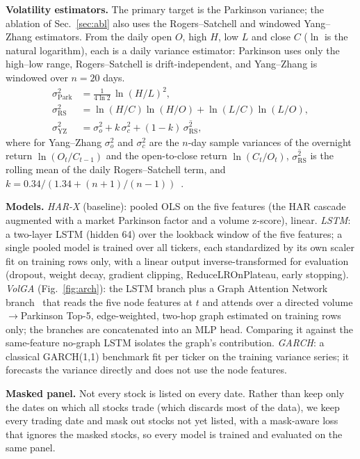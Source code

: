 \documentclass[runningheads]{llncs}
\begin{document}
\textbf{Volatility estimators.} The primary target is the Parkinson variance; the ablation of
Sec.~\ref{sec:abl} also uses the Rogers--Satchell and windowed Yang--Zhang estimators. From the daily open $O$,
high $H$, low $L$ and close $C$ ($\ln$ is the natural logarithm), each is a daily variance estimator: Parkinson
uses only the high--low range, Rogers--Satchell is drift-independent, and Yang--Zhang is windowed over $n{=}20$
days.
\begin{align*}
\sigma^2_{\mathrm{Park}} &= \tfrac{1}{4\ln 2}\,\ln(H/L)^2,\\
\sigma^2_{\mathrm{RS}} &= \ln(H/C)\ln(H/O)+\ln(L/C)\ln(L/O),\\
\sigma^2_{\mathrm{YZ}} &= \sigma^2_{o}+k\,\sigma^2_{c}+(1-k)\,\overline{\sigma^2_{\mathrm{RS}}},
\end{align*}
where for Yang--Zhang $\sigma^2_{o}$ and $\sigma^2_{c}$ are the $n$-day sample variances of the overnight return
$\ln(O_t/C_{t-1})$ and the open-to-close return $\ln(C_t/O_t)$, $\overline{\sigma^2_{\mathrm{RS}}}$ is the
rolling mean of the daily Rogers--Satchell term, and $k=0.34/(1.34+(n{+}1)/(n{-}1))$~\cite{yangzhang2000,rogers1991}.

\textbf{Models.} \emph{HAR-X} (baseline): pooled OLS on the five features (the HAR cascade augmented with a market Parkinson factor and a volume z-score), linear. \emph{LSTM}: a two-layer LSTM
(hidden 64) over the lookback window of the five features; a single pooled model is trained over all tickers,
each standardized by its own scaler fit on training rows only, with a linear output inverse-transformed for
evaluation (dropout, weight decay, gradient clipping, ReduceLROnPlateau, early stopping). \emph{VolGA}
(Fig.~\ref{fig:arch}): the LSTM branch plus a Graph Attention Network branch~\cite{gat2018} that reads the five
node features at $t$ and attends over a directed volume$\to$Parkinson Top-5, edge-weighted, two-hop graph
estimated on training rows only; the branches are concatenated into an MLP head. Comparing it against the same-feature no-graph LSTM isolates the graph's contribution. \emph{GARCH}: a classical GARCH(1,1)
benchmark fit per ticker on the training variance series; it forecasts the variance directly and does not use
the node features.

\textbf{Masked panel.} Not every stock is listed on every date. Rather than keep only the dates on which all
stocks trade (which discards most of the data), we keep every trading date and mask out stocks not yet listed,
with a mask-aware loss that ignores the masked stocks, so every model is trained and evaluated on the same
panel.
\end{document}
